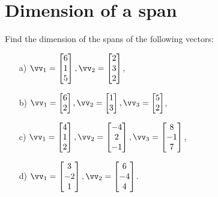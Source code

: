 \section{Dimension of a span}
\begin{problem}%
    Find the dimension of the spans of the following vectors:

    \begin{enumerate}
        \item[a) ] $\vv_1=\begin{bmatrix}6\\1\\5\end{bmatrix},  \vv_2=\begin{bmatrix}
            2\\3\\2
        \end{bmatrix}$,

        
        \item[b) ] $\vv_1=\begin{bmatrix}6\\2\end{bmatrix},  \vv_2=\begin{bmatrix}
            1\\3
        \end{bmatrix},  \vv_3=\begin{bmatrix}
            5\\2
        \end{bmatrix}$,
        
        \item[c) ] $\vv_1=\begin{bmatrix}4\\1\\2\end{bmatrix},  \vv_2=\begin{bmatrix}
            -4\\2\\-1
        \end{bmatrix},  \vv_3=\begin{bmatrix}
            8\\-1\\7
        \end{bmatrix}$,
        
        \item[d) ] $\vv_1=\begin{bmatrix}3\\-2\\1\end{bmatrix},  \vv_2=\begin{bmatrix}
            6\\-4\\4
        \end{bmatrix}$.
        
    \end{enumerate}
\end{problem}
